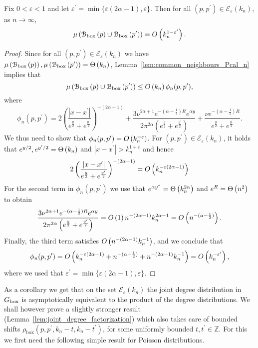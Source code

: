 \begin{lemma}\label{cor:expected_common_neighbours_Ecal_set}
Fix $0 < \varepsilon < 1$ and let $\varepsilon^\prime = \min\{\varepsilon(2\alpha - 1),\varepsilon\}$. Then for all $(p,p^\prime) \in \mathcal{E}_\varepsilon(k_n)$, as $n \to \infty$,
\[
	\mu\left({\mathcal B}_{\text{box}}\left(p\right) \cup {\mathcal B}_{\text{box}}\left(p^\prime\right)\right) = O\left(k_n^{1-\varepsilon^\prime}\right).
\] 
\end{lemma}

\begin{proof}
Since for all $(p,p^\prime) \in \mathcal{E}_\varepsilon(k_n)$ we have $\mu\left({\mathcal B}_{\text{box}}\left(p\right)\right), \mu\left({\mathcal B}_{\text{box}}\left(p^\prime\right)\right) = \Theta\left(k_n\right)$, Lemma~\ref{lem:common_neighbours_Pcal_n} implies that
\[
	\mu\left({\mathcal B}_{\text{box}}\left(p\right) \cup {\mathcal B}_{\text{box}}\left(p^\prime\right)\right) \le O\left(k_n\right) \phi_n(p,p^\prime),
\]
where
\[
	\phi_n(p,p^\prime) = 2\left(\frac{|x - x^\prime|}{e^{\frac{y}{2}} + e^{\frac{y^\prime}{2}}}\right)^{-(2\alpha - 1)} 
		+ \frac{3 \nu^{2\alpha + 1}e^{-(\alpha - \frac{1}{2})R} e^{\alpha y}}{2 \pi^{2\alpha}\left(
		e^{\frac{y}{2}} + e^{\frac{y^\prime}{2}}\right)}
		+ \frac{\nu e^{-(\alpha - \frac{1}{2})R}}{e^{\frac{y}{2}} + e^{\frac{y^\prime}{2}}}. 
\]
We thus need to show that $\phi_n(p,p^\prime) = O\left(k_n^{-\varepsilon}\right)$. For $(p,p^\prime) \in \mathcal{E}_\varepsilon(k_n)$, it holds that $e^{y/2}, e^{y^\prime/2} = \Theta\left(k_n\right)$ and $|x - x^\prime| > k_n^{1+\varepsilon}$ and hence
\begin{align*}
	 2\left(\frac{|x - x^\prime|}{e^{\frac{y}{2}} + e^{\frac{y^\prime}{2}}}\right)^{-(2\alpha - 1)}
	 =	O\left(k_n^{-\varepsilon(2\alpha - 1)}\right)
\end{align*}
For the second term in $\phi_n(p,p^\prime)$ we use that $e^{\alpha y^\ast} = \Theta\left(k_n^{2\alpha}\right)$ and $e^{R} = \Theta\left(n^2\right)$ to obtain
\[
	\frac{3 \nu^{2\alpha + 1}e^{-(\alpha - \frac{1}{2})R} e^{\alpha y}}{2 \pi^{2\alpha}\left(
			e^{\frac{y}{2}} + e^{\frac{y^\prime}{2}}\right)}
	= O\left(1\right) n^{-(2\alpha - 1)} k_n^{2\alpha - 1} = O\left(n^{-(\alpha - \frac{1}{2})}\right).
\]
Finally, the third term satisfies $O\left(n^{-(2\alpha - 1)}k_n^{-1}\right)$, and we conclude that
\[
	\phi_n(p,p^\prime) = O\left(k_n^{-\varepsilon(2\alpha - 1)} + n^{-(\alpha - \frac{1}{2})}
	+ n^{-(2\alpha - 1)}k_n^{-1}\right) = O\left(k_n^{-\varepsilon^\prime}\right),
\]
where we used that $\varepsilon^\prime = \min\{\varepsilon(2\alpha - 1),\varepsilon\}$. 
\end{proof}

As a corollary we get that on the set $\mathcal{E}_\varepsilon(k_n)$ the joint degree distribution in $G_{\text{box}}$ is asymptotically equivalent to the product of the degree distributions. We shall however prove a slightly stronger result (Lemma~\ref{lem:joint_degree_factorization}) which also takes care of bounded shifts $\rho_{\text{box}}(p,p^\prime,k_n - t,k_n - t^\prime)$, for some uniformly bounded $t, t^\prime \in \mathbb{Z}$. For this we first need the following simple result for Poisson distributions.

